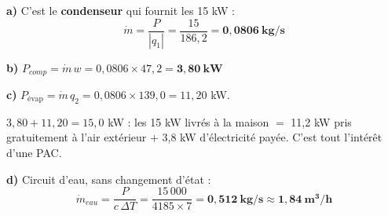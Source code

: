 \documentclass[11pt,a4paper]{article}
\begin{document}
\textbf{a)} C'est le \textbf{condenseur} qui fournit les 15 kW :
\[\dot m=\frac{P}{|q_1|}=\frac{15}{186{,}2}=\mathbf{0{,}0806\ \text{kg/s}}\]

\textbf{b)} $P_{comp}=\dot m\,w=0{,}0806\times47{,}2=\mathbf{3{,}80\ \text{kW}}$

\textbf{c)} $P_{\text{\'evap}}=\dot m\,q_2=0{,}0806\times139{,}0=11{,}20$ kW.
\begin{verif}
$3{,}80+11{,}20=15{,}0$ kW \checkmark : les 15 kW livrés à la maison $=$ 11,2 kW pris
gratuitement à l'air extérieur $+$ 3,8 kW d'électricité payée. C'est tout l'intérêt d'une PAC.
\end{verif}

\textbf{d)} Circuit d'eau, sans changement d'état :
\[\dot m_{eau}=\frac{P}{c\,\Delta T}=\frac{15\,000}{4185\times7}
=\mathbf{0{,}512\ \text{kg/s}}\approx\mathbf{1{,}84\ \text{m}^3/\text{h}}\]
\end{document}
